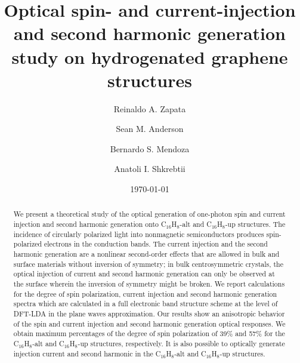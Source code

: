 \documentclass[aps,pra,11pt,tightenlines,showpacs,superscriptaddress,groupedaddress]{revtex4-1}
\newcommand{\altstc}{C$_{16}$H$_{8}$-alt}
\newcommand{\upstc}{C$_{16}$H$_{8}$-up}
\begin{document}
\title{Optical spin- and current-injection and second harmonic generation study on hydrogenated graphene structures}

\author{Reinaldo A. Zapata}
\author{Sean M. Anderson}
\author{Bernardo S. Mendoza}
\author{Anatoli I. Shkrebtii}

\date{\today}



\begin{abstract}

We present a theoretical study of the optical generation of one-photon spin and
current injection and second harmonic generation onto {\altstc} and {\upstc} structures. The incidence of
circularly polarized light into nonmagnetic semiconductors produces spin-
polarized electrons in the conduction bands. The current injection and the
second harmonic generation are a nonlinear second-order effects that are
allowed in bulk and surface materials without inversion of symmetry; in bulk 
centrosymmetric crystals, the optical injection of current and second harmonic generation can
only be observed at the surface wherein the inversion of symmetry might be
broken. We report calculations for the degree of spin polarization, current
injection and second harmonic generation spectra which are calculated in a full
electronic band structure scheme at the level of DFT-LDA in the plane waves
approximation. Our results show an anisotropic behavior of the spin and
current injection and second harmonic generation optical responses. We obtain
maximum percentages of the degree of spin polarization of 39\% and 57\% for the
{\altstc} and {\upstc} structures, respectively. It is also possible to
optically generate injection current and second harmonic in the {\altstc} and
{\upstc} structures.

\end{abstract}


\end{document}
